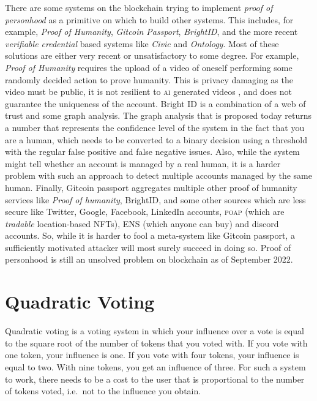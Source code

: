 There are some systems on the blockchain trying to implement \emph{proof of personhood} as a primitive on which to build other systems.
This includes, for example, \emph{Proof of Humanity}, \emph{Gitcoin Passport}, \emph{BrightID}, and the more recent \emph{verifiable credential} based systems like \emph{Civic} and \emph{Ontology}.
Most of these solutions are either very recent or unsatisfactory to some degree.
For example, \emph{Proof of Humanity} requires the upload of a video of oneself performing some randomly decided action to prove humanity.
This is privacy damaging as the video must be public, it is not resilient to \textsc{ai} generated videos%
, and does not guarantee the uniqueness of the account.
Bright ID is a combination of a web of trust and some graph analysis.
The graph analysis that is proposed today returns a number that represents the confidence level of the system in the fact that you are a human, which needs to be converted to a binary decision using a threshold with the regular false positive and false negative issues.
Also, while the system might tell whether an account is managed by a real human, it is a harder problem with such an approach to detect multiple accounts managed by the same human.
Finally, Gitcoin passport aggregates multiple other proof of humanity services like \textit{Proof of humanity}, BrightID, and some other sources which are less secure like Twitter, Google, Facebook, LinkedIn accounts, \textsc{poap} (which are \textit{tradable} location-based NFTs), ENS (which anyone can buy) and discord accounts.
So, while it is harder to fool a meta-system like Gitcoin passport, a sufficiently motivated attacker will most surely succeed in doing so.
Proof of personhood is still an unsolved problem on blockchain as of September 2022.

\section{Quadratic Voting}

Quadratic voting is a voting system in which your influence over a vote is equal to the square root of the number of tokens that you voted with.
If you vote with one token, your influence is one.
If you vote with four tokens, your influence is equal to two.
With nine tokens, you get an influence of three.
For such a system to work, there needs to be a cost to the user that is proportional to the number of tokens voted, i.e.\ not to the influence you obtain.

